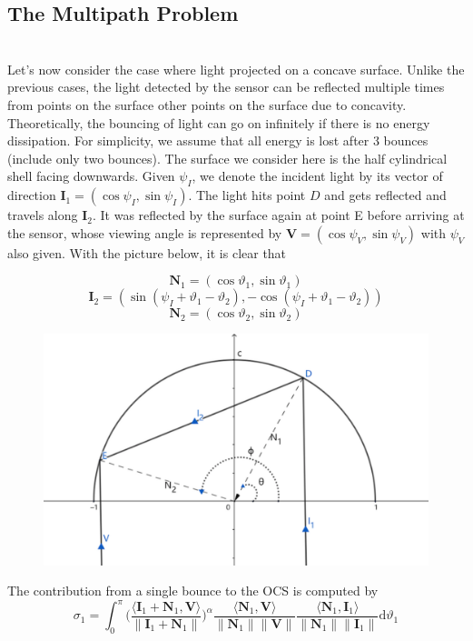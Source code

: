 \documentclass[11pt]{amsart}
\newcommand{\ip}[2]{\langle {#1}, {#2} \rangle}
\theoremstyle{definition}
\begin{document}
\subsection{The Multipath Problem}~\\
Let's now consider the case where light projected on a concave surface. Unlike the previous cases, the light detected by the sensor can be reflected multiple times from points on the surface other points on the surface due to concavity. Theoretically, the bouncing of light can go on infinitely if there is no energy dissipation. For simplicity, we assume that all energy is lost after 3 bounces (include only two bounces). The surface we consider here is the half cylindrical shell facing downwards. Given $\psi_I$, we denote the incident light by its vector of direction $\mathbf{I}_1=(\cos\psi_I,\sin\psi_I)$. The light hits point $D$ and gets reflected and travels along $\mathbf{I}_2$. It was reflected by the surface again at point E before arriving at the sensor, whose viewing angle is represented by $\mathbf{V}=(\cos\psi_V,\sin\psi_V)$ with $\psi_V$ also given. With the picture below, it is clear that

$$\mathbf{N}_1=(\cos\vartheta_1,\sin\vartheta_1)$$
$$\mathbf{I}_2= (\sin(\psi_I+\vartheta_1-\vartheta_2),-\cos(\psi_I+\vartheta_1-\vartheta_2))$$
$$\mathbf{N}_2= (\cos\vartheta_2,\sin\vartheta_2)$$

\begin{figure}[H]
  \includegraphics[width=4.5in]{./figs/multipath.pdf}
  \label{fig:reflection}
\end{figure}


The contribution from a single bounce to the OCS is computed by
$$\sigma_1 =\int_{0}^{\pi}\Bigg(\frac{\ip{\mathbf{I}_1+\mathbf{N}_1}{\mathbf{V}}}{\|\mathbf{I}_1+\mathbf{N}_1\|}\Bigg)^\alpha\frac{\ip{\mathbf{N}_1}{\mathbf{V}}}{\|\mathbf{N}_1\| \|\mathbf{V}\|}\frac{\ip{\mathbf{N}_1}{\mathbf{I}_1}}{\|\mathbf{N}_1\| \|\mathbf{I}_1\|} \mathrm{d}\vartheta_1$$
\end{document}
